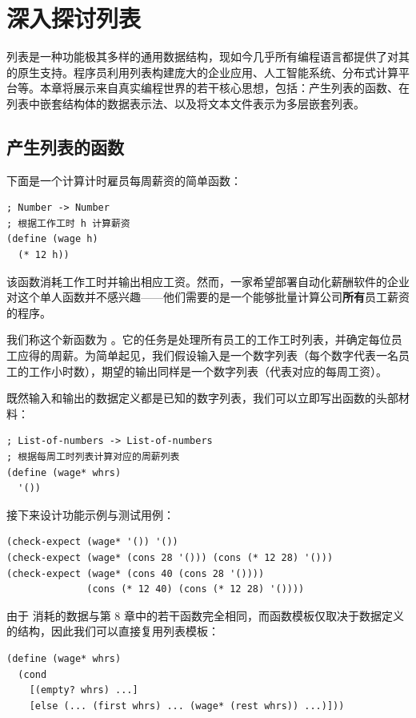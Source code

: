 
\chapter{深入探讨列表}
\label{sec:ch10_more_lists}

列表是一种功能极其多样的通用数据结构，现如今几乎所有编程语言都提供了对其的原生支持。程序员利用列表构建庞大的企业应用、人工智能系统、分布式计算平台等。本章将展示来自真实编程世界的若干核心思想，包括：产生列表的函数、在列表中嵌套结构体的数据表示法、以及将文本文件表示为多层嵌套列表。

\section{产生列表的函数}
\label{sec:ch10_functions_produce_lists}

下面是一个计算计时雇员每周薪资的简单函数：
\begin{lstlisting}[language=BSL]
; Number -> Number
; 根据工作工时 h 计算薪资
(define (wage h)
  (* 12 h))
\end{lstlisting}

该函数消耗工作工时并输出相应工资。然而，一家希望部署自动化薪酬软件的企业对这个单人函数并不感兴趣——他们需要的是一个能够批量计算公司\textbf{所有}员工薪资的程序。

我们称这个新函数为 。它的任务是处理所有员工的工作工时列表，并确定每位员工应得的周薪。为简单起见，我们假设输入是一个数字列表（每个数字代表一名员工的工作小时数），期望的输出同样是一个数字列表（代表对应的每周工资）。

既然输入和输出的数据定义都是已知的数字列表，我们可以立即写出函数的头部材料：
\begin{lstlisting}[language=BSL]
; List-of-numbers -> List-of-numbers
; 根据每周工时列表计算对应的周薪列表
(define (wage* whrs)
  '())
\end{lstlisting}

接下来设计功能示例与测试用例：
\begin{lstlisting}[language=BSL]
(check-expect (wage* '()) '())
(check-expect (wage* (cons 28 '())) (cons (* 12 28) '()))
(check-expect (wage* (cons 40 (cons 28 '())))
              (cons (* 12 40) (cons (* 12 28) '())))
\end{lstlisting}

由于  消耗的数据与第 8 章中的若干函数完全相同，而函数模板仅取决于数据定义的结构，因此我们可以直接复用列表模板：
\begin{lstlisting}[language=BSL]
(define (wage* whrs)
  (cond
    [(empty? whrs) ...]
    [else (... (first whrs) ... (wage* (rest whrs)) ...)]))
\end{lstlisting}

